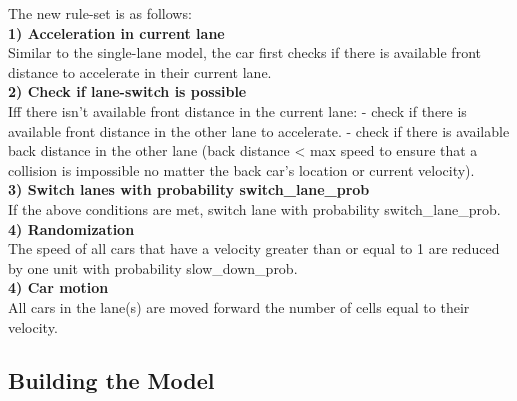\documentclass[11pt]{article}
\begin{document}
The new rule-set is as follows:\\

\textbf{1) Acceleration in current lane}\\

Similar to the single-lane model, the car first checks if there is
available front distance to accelerate in their current lane.\\

\textbf{2) Check if lane-switch is possible}\\

Iff there isn't available front distance in the current lane: - check if
there is available front distance in the other lane to accelerate. -
check if there is available back distance in the other lane (back
distance \textless{} max speed to ensure that a collision is impossible
no matter the back car's location or current velocity).\\

\textbf{3) Switch lanes with probability switch\_lane\_prob}\\

If the above conditions are met, switch lane with probability
switch\_lane\_prob.\\

\textbf{4) Randomization}\\

The speed of all cars that have a velocity greater than or equal to 1
are reduced by one unit with probability slow\_down\_prob.\\

\textbf{4) Car motion}\\

All cars in the lane(s) are moved forward the number of cells equal to
their velocity.\\

\newpage

    \subsection{Building the Model}
\end{document}
